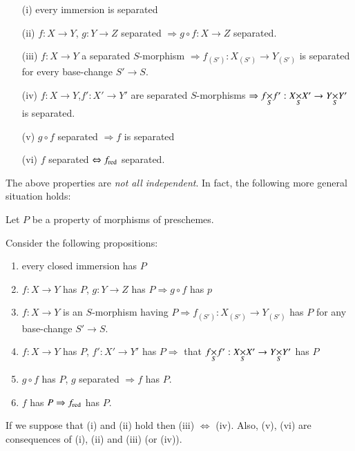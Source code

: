 \begin{itemize}
\item[(i)] every immersion is separated

\item[(ii)] $f:X\to Y$, $g:Y\to Z$ separated $\Rightarrow g\circ
  f:X\to Z$ separated.

\item[(iii)] $f:X\to Y$ a separated $S$-morphism $\Rightarrow
  f_{(S')}:X_{(S')}\to Y_{(S')}$ is separated for every
  base-change $S'\to S$.

\item[(iv)] $f:X\to Y$,\pageoriginale $f':X'\to Y'$ are separated
  $S$-morphisms $\Rightarrow \fprod{f}{f'}{S}:\fprod{X}{X'}{S}\to
  \fprod{Y}{Y'}{S}$ is separated.

\item[(v)] $g\circ f$ separated $\Rightarrow f$ is separated

\item[(vi)] $f$ separated $\Leftrightarrow f_{\operatorname{red}}$ separated.
\end{itemize}

The above properties are {\em not all independent}. In fact, the
following more general situation holds:

Let $P$ be a property of morphisms of preschemes.

Consider the following propositions:
\begin{enumerate}
\renewcommand{\theenumi}{\roman{enumi}}
\renewcommand{\labelenumi}{(\theenumi)}
\item every closed immersion has $P$

\item $f:X\to Y$ has $P$, $g:Y\to Z$ has $P\Rightarrow g\circ f$ has $p$

\item $f:X\to Y$ is an $S$-morphism having $P\Rightarrow f_{(S')}:X_{(S')}\to Y_{(S')}$ has $P$ for any base-change $S'\to S$.

\item $f:X\to Y$ has $P$, $f':X'\to Y'$ has $P\Rightarrow$ that $\fprod{f}{f'}{S}:\fprod{X}{X'}{S}\to \fprod{Y}{Y'}{S}$ has $P$

\item $g\circ f$ has $P$, $g$ separated $\Rightarrow f$ has $P$.

\item $f$ has $P\Rightarrow f_{\operatorname{red}}$ has $P$. 
\end{enumerate}

If we suppose that (i) and (ii) hold then (iii) $\Leftrightarrow$
(iv). Also, (v), (vi) are consequences of (i), (ii) and (iii) (or
(iv)). 

